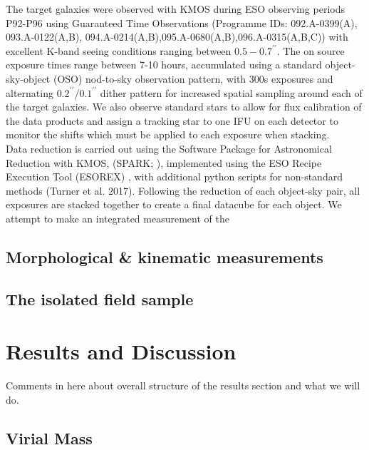\documentclass[a4paper,fleqn,usenatbib]{mn2e}
\begin{document}
The target galaxies were observed with KMOS during ESO observing periods P92-P96 using Guaranteed Time Observations (Programme IDs: 092.A-0399(A), 093.A-0122(A,B), 094.A-0214(A,B),095.A-0680(A,B),096.A-0315(A,B,C)) with excellent K-band seeing conditions ranging between $0.5-0.7^{\prime\prime}$.
The on source exposure times range between 7-10 hours, accumulated using a standard object-sky-object (OSO) nod-to-sky observation pattern, with 300s exposures and alternating $0.2^{\prime\prime}$/$0.1^{\prime\prime}$ dither pattern for increased spatial sampling around each of the target galaxies.
We also observe standard stars to allow for flux calibration of the data products and assign a tracking star to one IFU on each detector to monitor the shifts which must be applied to each exposure when stacking. \\ 

Data reduction is carried out using the Software Package for Astronomical Reduction with KMOS, (SPARK; \cite{Davies2013}), implemented using the ESO Recipe Execution Tool (ESOREX) \citep{Freudling2013}, with additional python scripts for non-standard methods (Turner et al. 2017).
Following the reduction of each object-sky pair, all exposures are stacked together to create a final datacube for each object. 
We attempt to make an integrated measurement of the 


\subsection{Morphological \& kinematic measurements}\label{subsec:measurements}

\subsection{The isolated field sample}\label{subsec:isolated_field_sample}


\section{Results and Discussion}\label{sec:results}
Comments in here about overall structure of the results section and what we will do.

\subsection{Virial Mass}\label{subsec:dynamical_masses}
\end{document}
